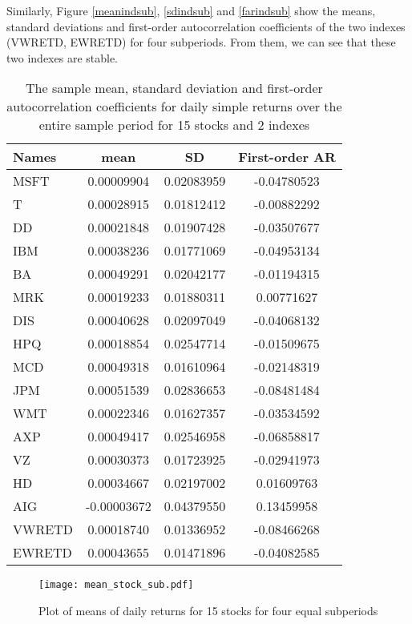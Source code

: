 \documentclass[11pt]{article}
\begin{document}
Similarly, Figure \ref{meanindsub}, \ref{sdindsub} and \ref{farindsub} show the means, standard deviations and first-order autocorrelation coefficients of the two indexes (VWRETD, EWRETD) for four subperiods. From them, we can see that these two indexes are stable.
\begin{table}
\centering
\begin{tabular}{lccc}
  \hline
Names &mean & SD & First-order AR \\ 
  \hline
MSFT & 0.00009904 & 0.02083959 & -0.04780523 \\ 
  T & 0.00028915 & 0.01812412 & -0.00882292 \\ 
  DD & 0.00021848 & 0.01907428 & -0.03507677 \\ 
  IBM & 0.00038236 & 0.01771069 & -0.04953134 \\ 
  BA & 0.00049291 & 0.02042177 & -0.01194315 \\ 
  MRK & 0.00019233 & 0.01880311 & 0.00771627 \\ 
  DIS & 0.00040628 & 0.02097049 & -0.04068132 \\ 
  HPQ & 0.00018854 & 0.02547714 & -0.01509675 \\ 
  MCD & 0.00049318 & 0.01610964 & -0.02148319 \\ 
  JPM & 0.00051539 & 0.02836653 & -0.08481484 \\ 
  WMT & 0.00022346 & 0.01627357 & -0.03534592 \\ 
  AXP & 0.00049417 & 0.02546958 & -0.06858817 \\ 
  VZ & 0.00030373 & 0.01723925 & -0.02941973 \\ 
  HD & 0.00034667 & 0.02197002 & 0.01609763 \\ 
  AIG & -0.00003672 & 0.04379550 & 0.13459958 \\ 
  VWRETD & 0.00018740 & 0.01336952 & -0.08466268 \\ 
  EWRETD & 0.00043655 & 0.01471896 & -0.04082585 \\ 
   \hline
\end{tabular}
\caption{The sample mean, standard deviation and first-order autocorrelation coefficients for daily simple returns over the entire sample period for 15 stocks and 2 indexes}\label{tab1}
\end{table}
\begin{figure}
\centering
\texttt{[image: mean\_stock\_sub.pdf]}
\caption{Plot of means of daily returns for 15 stocks for four equal subperiods }
\label{meanstocksub}
\end{figure}
\end{document}
